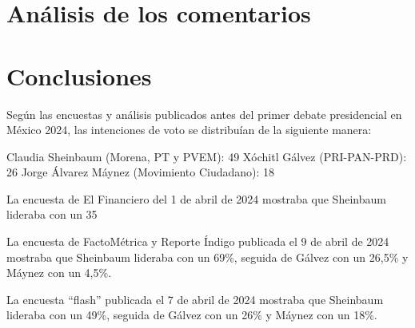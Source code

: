 \chapter{Análisis de los comentarios}





\chapter{Conclusiones}

Según las encuestas y análisis publicados antes del primer debate presidencial en México 2024, las intenciones de voto se distribuían de la siguiente manera:

Claudia Sheinbaum (Morena, PT y PVEM): 49%
Xóchitl Gálvez (PRI-PAN-PRD): 26%
Jorge Álvarez Máynez (Movimiento Ciudadano): 18%


La encuesta de El Financiero del 1 de abril de 2024 mostraba que Sheinbaum lideraba con un 35%

La encuesta de FactoMétrica y Reporte Índigo publicada el 9 de abril de 2024 mostraba que Sheinbaum lideraba con un 69\%, seguida de Gálvez con un 26,5\% y Máynez con un 4,5\%.

La encuesta “flash” publicada el 7 de abril de 2024 mostraba que Sheinbaum lideraba con un 49\%, seguida de Gálvez con un 26\% y Máynez con un 18\%.